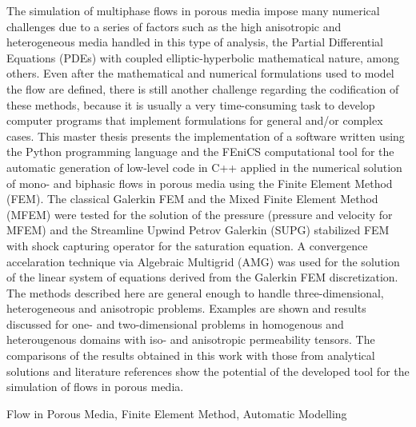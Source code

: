 The simulation of multiphase flows in porous media impose many numerical challenges due to a series of factors such as the high anisotropic and heterogeneous media handled in this type of analysis, the Partial Differential Equations (PDEs) with coupled elliptic-hyperbolic mathematical nature, among others. Even after the mathematical and numerical formulations used to model the flow are defined, there is still another challenge regarding the codification of these methods, because it is usually a very time-consuming task to develop computer programs that implement formulations for general and/or complex cases. This master thesis presents the implementation of a software written using the Python programming language and the FEniCS computational tool for the automatic generation of low-level code in C++ applied in the numerical solution of mono- and biphasic flows in porous media using the Finite Element Method (FEM). The classical Galerkin FEM and the Mixed Finite Element Method (MFEM) were tested for the solution of the pressure (pressure and velocity for MFEM) and the Streamline Upwind Petrov Galerkin (SUPG) stabilized FEM with shock capturing operator for the saturation equation. A convergence accelaration technique via Algebraic Multigrid (AMG) was used for the solution of the linear system of equations derived from the Galerkin FEM discretization. The methods described here are general enough to handle three-dimensional, heterogeneous and anisotropic problems. Examples are shown and results discussed for one- and two-dimensional problems in homogenous and heterougenous domains with iso- and anisotropic permeability tensors. The comparisons of the results obtained in this work with those from analytical solutions and literature references show the potential of the developed tool for the simulation of flows in porous media.

\begin{keywords}
Flow in Porous Media, Finite Element Method, Automatic Modelling
\end{keywords}
